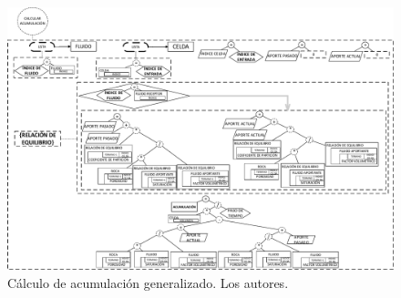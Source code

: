 \begin{figure}[h]
	\centering%
	\includegraphics[width=0.9\linewidth]{Fig/CalcularAcumulacion.pdf}%
	\caption[Cálculo de acumulación generalizado.]{Cálculo de acumulación generalizado. Los autores.} \label{fig:Accumulation}
\end{figure}

